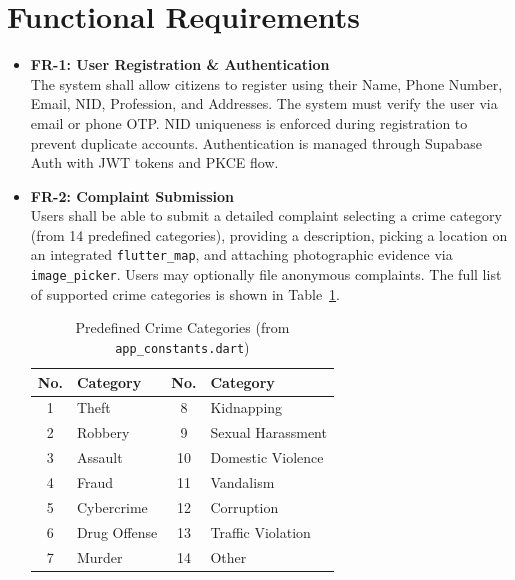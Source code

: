 \documentclass[11pt, a4paper]{report}
\begin{document}
\section{Functional Requirements}
\begin{itemize}
    \item \textbf{FR-1: User Registration \& Authentication}\\
    The system shall allow citizens to register using their Name, Phone Number, Email, NID, Profession, and Addresses. The system must verify the user via email or phone OTP. NID uniqueness is enforced during registration to prevent duplicate accounts. Authentication is managed through Supabase Auth with JWT tokens and PKCE flow.

    \item \textbf{FR-2: Complaint Submission}\\
    Users shall be able to submit a detailed complaint selecting a crime category (from 14 predefined categories), providing a description, picking a location on an integrated \texttt{flutter\_map}, and attaching photographic evidence via \texttt{image\_picker}. Users may optionally file anonymous complaints. The full list of supported crime categories is shown in Table~\ref{tab:categories}.

    \begin{table}[ht]
    \centering
    \caption{Predefined Crime Categories (from \texttt{app\_constants.dart})}
    \label{tab:categories}
    \begin{tabular}{clcl}
    \toprule
    \textbf{No.} & \textbf{Category} & \textbf{No.} & \textbf{Category} \\
    \midrule
    1 & Theft & 8 & Kidnapping \\
    2 & Robbery & 9 & Sexual Harassment \\
    3 & Assault & 10 & Domestic Violence \\
    4 & Fraud & 11 & Vandalism \\
    5 & Cybercrime & 12 & Corruption \\
    6 & Drug Offense & 13 & Traffic Violation \\
    7 & Murder & 14 & Other \\
    \bottomrule
    \end{tabular}
    \end{table}


\end{itemize}
\end{document}
